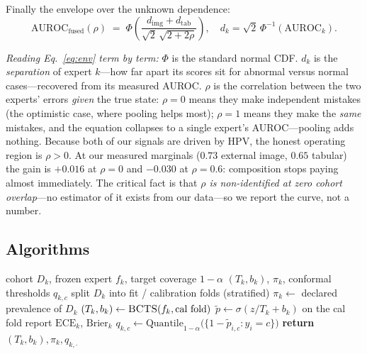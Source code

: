 \documentclass[sigplan,nonacm,screen]{acmart}
\begin{document}
Finally the envelope over the unknown dependence:
\begin{equation}
\mathrm{AUROC}_{\mathrm{fused}}(\rho) \;=\; \Phi\!\left(\frac{d_{\mathrm{img}}+d_{\mathrm{tab}}}{\sqrt{2}\,\sqrt{2+2\rho}}\right),
\quad d_k=\sqrt{2}\,\Phi^{-1}(\mathrm{AUROC}_k).
\label{eq:env}
\end{equation}

\emph{Reading Eq.~\eqref{eq:env} term by term:} $\Phi$ is the standard normal CDF. $d_k$ is the \emph{separation} of expert $k$---how far apart its scores sit for abnormal versus normal cases---recovered from its measured AUROC. $\rho$ is the correlation between the two experts' errors \emph{given} the true state: $\rho=0$ means they make independent mistakes (the optimistic case, where pooling helps most); $\rho=1$ means they make the \emph{same} mistakes, and the equation collapses to a single expert's AUROC---pooling adds nothing. Because both of our signals are driven by HPV, the honest operating region is $\rho>0$. At our measured marginals ($0.73$ external image, $0.65$ tabular) the gain is $+0.016$ at $\rho=0$ and $-0.030$ at $\rho=0.6$: composition stops paying almost immediately. The critical fact is that \emph{$\rho$ is non-identified at zero cohort overlap}---no estimator of it exists from our data---so we report the curve, not a number.

\subsection{Algorithms}

\begin{algorithm}[t]
\caption{CO-PRIOR fit (per expert, one cohort at a time)}
\label{alg:fit}
\footnotesize
\begin{algorithmic}[1]
\Require cohort $D_k$, frozen expert $f_k$, target coverage $1-\alpha$
\Ensure $(T_k,b_k)$, $\pi_k$, conformal thresholds $q_{k,c}$
\State split $D_k$ into fit / calibration folds (stratified)
\State $\pi_k \gets$ declared prevalence of $D_k$ 
\State $(T_k,b_k) \gets \Call{BCTS}{f_k, \text{cal fold}}$ 
\State $\tilde p \gets \sigma(z/T_k + b_k)$ on the cal fold
\State report $\mathrm{ECE}_k$, $\mathrm{Brier}_k$ 
  \State $q_{k,c} \gets \mathrm{Quantile}_{1-\alpha}\big(\{1-\tilde p_{i,c} : y_i = c\}\big)$
\EndFor
\State \textbf{return} $(T_k,b_k), \pi_k, q_{k,\cdot}$
\end{algorithmic}
\end{algorithm}
\end{document}

